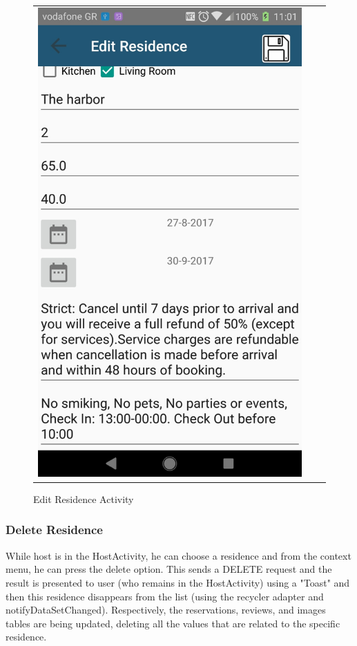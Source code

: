 \documentclass[12pt]{article}
\begin{document}
\begin{center}
\begin{figure}
\begin{tabular}{c c c}
				\includegraphics[scale=0.17, keepaspectratio]{29-editResidence.jpg}
				\\
			\end{tabular}
			\caption{Edit Residence Activity}
		\end{figure}
	\end{center}
	
	\subsubsection{Delete Residence}
	While host is in the HostActivity, he can choose a residence and from the context menu, he can press the delete option. This sends a DELETE request and the result is presented to user (who remains in the HostActivity) using a "Toast" and then this residence disappears from the list (using the recycler adapter and notifyDataSetChanged). Respectively, the reservations, reviews, and images tables are being updated, deleting all the values that are related to the specific residence.
	
\end{document}

